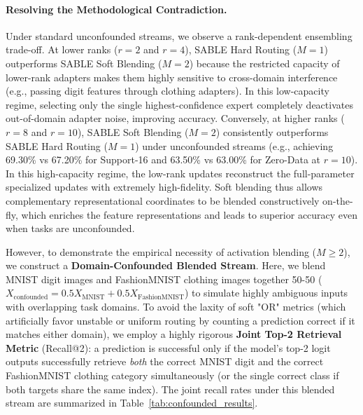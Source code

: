 \paragraph{Resolving the Methodological Contradiction.} Under standard unconfounded streams, we observe a rank-dependent ensembling trade-off. At lower ranks ($r=2$ and $r=4$), SABLE Hard Routing ($M=1$) outperforms SABLE Soft Blending ($M=2$) because the restricted capacity of lower-rank adapters makes them highly sensitive to cross-domain interference (e.g., passing digit features through clothing adapters). In this low-capacity regime, selecting only the single highest-confidence expert completely deactivates out-of-domain adapter noise, improving accuracy. Conversely, at higher ranks ($r=8$ and $r=10$), SABLE Soft Blending ($M=2$) consistently outperforms SABLE Hard Routing ($M=1$) under unconfounded streams (e.g., achieving 69.30\% vs 67.20\% for Support-16 and 63.50\% vs 63.00\% for Zero-Data at $r=10$). In this high-capacity regime, the low-rank updates reconstruct the full-parameter specialized updates with extremely high-fidelity. Soft blending thus allows complementary representational coordinates to be blended constructively on-the-fly, which enriches the feature representations and leads to superior accuracy even when tasks are unconfounded.

However, to demonstrate the empirical necessity of activation blending ($M \ge 2$), we construct a \textbf{Domain-Confounded Blended Stream}. Here, we blend MNIST digit images and FashionMNIST clothing images together 50-50 ($X_{\text{confounded}} = 0.5 X_{\text{MNIST}} + 0.5 X_{\text{FashionMNIST}}$) to simulate highly ambiguous inputs with overlapping task domains. To avoid the laxity of soft "OR" metrics (which artificially favor unstable or uniform routing by counting a prediction correct if it matches either domain), we employ a highly rigorous \textbf{Joint Top-2 Retrieval Metric} (Recall@2): a prediction is successful only if the model's top-2 logit outputs successfully retrieve \emph{both} the correct MNIST digit and the correct FashionMNIST clothing category simultaneously (or the single correct class if both targets share the same index). The joint recall rates under this blended stream are summarized in Table~\ref{tab:confounded_results}.

